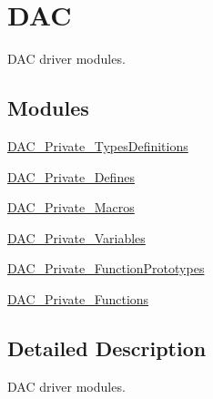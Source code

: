 \hypertarget{group___d_a_c}{\section{D\-A\-C}
\label{group___d_a_c}
}


D\-A\-C driver modules.  


\subsection*{Modules}
\begin{DoxyCompactItemize}
\item 
\hyperlink{group___d_a_c___private___types_definitions}{D\-A\-C\-\_\-\-Private\-\_\-\-Types\-Definitions}
\item 
\hyperlink{group___d_a_c___private___defines}{D\-A\-C\-\_\-\-Private\-\_\-\-Defines}
\item 
\hyperlink{group___d_a_c___private___macros}{D\-A\-C\-\_\-\-Private\-\_\-\-Macros}
\item 
\hyperlink{group___d_a_c___private___variables}{D\-A\-C\-\_\-\-Private\-\_\-\-Variables}
\item 
\hyperlink{group___d_a_c___private___function_prototypes}{D\-A\-C\-\_\-\-Private\-\_\-\-Function\-Prototypes}
\item 
\hyperlink{group___d_a_c___private___functions}{D\-A\-C\-\_\-\-Private\-\_\-\-Functions}
\end{DoxyCompactItemize}


\subsection{Detailed Description}
D\-A\-C driver modules. 